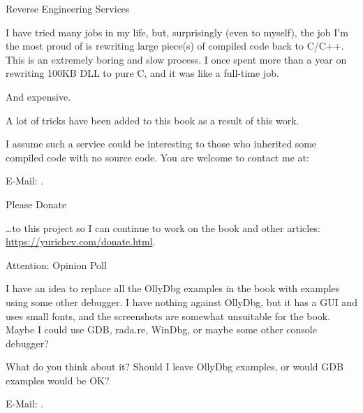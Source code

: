 \vspace*{\fill}

\huge Reverse Engineering Services
\normalsize

\bigskip
\bigskip
\bigskip


I have tried many jobs in my life, but, surprisingly (even to myself),
the job I'm the most proud of is rewriting large piece(s) of compiled code back to C/C++.
This is an extremely boring and slow process. I once spent more than a year on rewriting 100KB DLL to pure C,
and it was like a full-time job.

And expensive.

A lot of tricks have been added to this book as a result of this work.

I assume such a service could be interesting to those who inherited some compiled code with no source code.
You are welcome to contact me at:

E-Mail: \GTT{\EMAIL}.

\bigskip
\bigskip
\bigskip

\huge Please Donate
\normalsize

\bigskip
\bigskip
\bigskip

\dots to this project so I can continue to work on the book and other articles: \\
\url{https://yurichev.com/donate.html}.

\bigskip
\bigskip
\bigskip

\huge Attention: Opinion Poll
\normalsize

\bigskip
\bigskip
\bigskip

I have an idea to replace all the OllyDbg examples in the book with examples using some other debugger.
I have nothing against OllyDbg, but it has a GUI and uses small fonts, and the screenshots are somewhat unsuitable for the book.
Maybe I could use GDB, rada.re, WinDbg, or maybe some other console debugger?

What do you think about it?
Should I leave OllyDbg examples, or would GDB examples would be OK?

E-Mail: \GTT{\EMAIL}.

\vspace*{\fill}
\vfill
